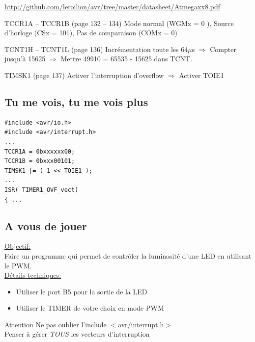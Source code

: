 \documentclass{beamer}
\begin{document}
\begin{frame}
  \hyperlink{http://github.com/leroilion/avr/tree/master/datasheet/Atmegaxx8.pdf}{http://github.com/leroilion/avr/tree/master/datasheet/Atmegaxx8.pdf}
  \pause
  \begin{block}{TCCR1A -- TCCR1B (page 132 -- 134)}
    Mode normal (WGMx = 0 ), Source d'horloge (CSx = 101), Pas de comparaison (COMx = 0) 
  \end{block}
  \pause
  \begin{block}{TCNT1H -- TCNT1L (page 136) }
    Incr\'ementation toute les 64$\mu$s \pause $\Longrightarrow$ Compter jusqu'\`a 15625 \pause $\Longrightarrow$ Mettre 49910 = 65535 - 15625 dans TCNT.
  \end{block}
  \pause
  \begin{block}{TIMSK1 (page 137)}
    Activer l'interruption d'overflow \pause $\Longrightarrow$ Activer TOIE1
  \end{block}
\end{frame}

\subsection{Tu me vois, tu me vois plus}

\lstset{language=c++} 
\lstset{commentstyle=\textit} 
\begin{lstlisting}
#include <avr/io.h>
#include <avr/interrupt.h>
...
TCCR1A = 0bxxxxxx00;
TCCR1B = 0bxxx00101;
TIMSK1 |= ( 1 << TOIE1 );
...
ISR( TIMER1_OVF_vect)
{ ...
\end{lstlisting}

\subsection{A vous de jouer}

\begin{frame}
  \underline{Objectif:}\\
  Faire un programme qui permet de contr\^oler la luminosit\'e d'une LED en utilisant le PWM.\\
  \pause
  \underline{D\'etails techniques:}\\
  \begin{itemize}
    \pause
    \item Utiliser le port B5 pour la sortie de la LED
    \pause
    \item Utiliser le TIMER de votre choix en mode PWM
  \end{itemize}

  \pause
  \begin{alertblock}{Attention}
    Ne pas oublier l'include $<$avr/interrupt.h$>$\\
    Penser \`a g\'erer \emph{TOUS} les vecteurs d'interruption
  \end{alertblock}
\end{frame}
\end{document}
